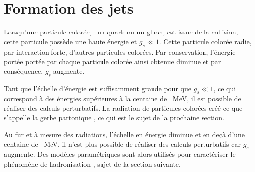 \section{Formation des jets}\label{chapter-JERC-section-jets}
Lorsqu'une particule colorée, \ie\ un quark ou un gluon, est issue de la collision, cette particule possède une haute énergie et $g_s \ll 1$. Cette particule colorée radie, par interaction forte, d'autres particules colorées. Par conservation, l'énergie portée portée par chaque particule colorée ainsi obtenue diminue et par conséquence, $g_s$ augmente.
\par Tant que l'échelle d'énergie est suffisamment grande pour que $g_s \ll 1$, ce qui correspond à des énergies supérieures à la centaine de \SI{}{\MeV}, il est possible de réaliser des calculs perturbatifs. La radiation de particules colorées créé ce que s'appelle la \og gerbe partonique \fg, ce qui est le sujet de la prochaine section.
\par Au fur et à mesure des radiations, l'échelle en énergie diminue et en deçà d'une centaine de \SI{}{\MeV}, il n'est plus possible de réaliser des calculs perturbatifs car $g_s$ augmente. Des modèles paramétriques sont alors utilisés pour caractériser le phénomène de \og hadronisation \fg, sujet de la section suivante.

